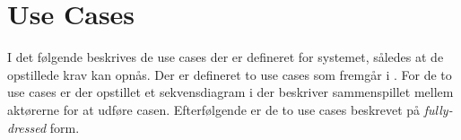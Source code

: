 \section{Use Cases}

I det følgende beskrives de use cases der er defineret for systemet, således at de opstillede krav kan opnås. Der er defineret to use cases som fremgår i . For de to use cases er der opstillet et sekvensdiagram i  der beskriver sammenspillet mellem aktørerne for at udføre casen.
Efterfølgende er de to use cases beskrevet på \textit{fully-dressed} form.




